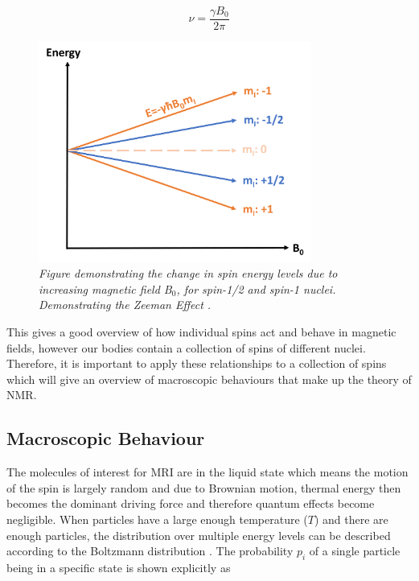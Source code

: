 \begin{equation}
    \nu = \frac{\gamma B_0}{2\pi}
    \label{eqn:theory:Lamor}
\end{equation}

\begin{figure}
    \centering
    \includegraphics[width=0.8\textwidth]{Figures/Theory/Zeeman.png}
    \caption{\textit{Figure demonstrating the change in spin energy levels due to increasing magnetic field B$_0$, for spin-1/2 and spin-1 nuclei. Demonstrating the Zeeman Effect \cite{Zeeman1896VerslagenAfdeeling}.}}
    \label{fig:theory:zeeman}
\end{figure}

This gives a good overview of how individual spins act and behave in magnetic fields, however our bodies contain a collection of spins of different nuclei. Therefore, it is important to apply these relationships to a collection of spins which will give an overview of macroscopic behaviours that make up the theory of \ac{NMR}.

\subsection{Macroscopic Behaviour}

The molecules of interest for \ac{MRI} are in the liquid state which means the motion of the spin is largely random and due to Brownian motion, thermal energy then becomes the dominant driving force and therefore quantum effects become negligible. When particles have a large enough temperature ($T$) and there are enough particles, the distribution over multiple energy levels can be described according to the Boltzmann distribution \cite{Boltzmann1872WeitereGasmolekulen}. The probability $p_i$ of a single particle being in a specific state is shown explicitly as 

